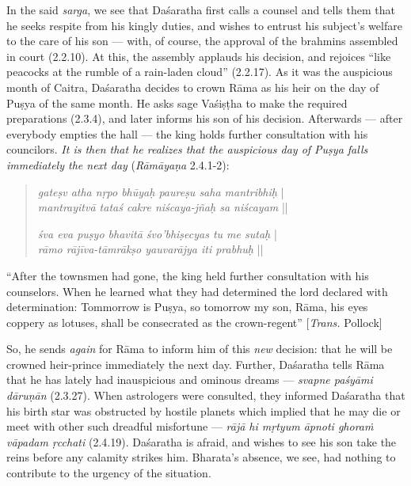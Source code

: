In the said {\sl sarga}, we see that Daśaratha first calls a counsel and tells them that he seeks respite from his kingly duties, and wishes to entrust his subject’s welfare to the care of his son --- with, of course, the approval of the brahmins assembled in court (2.2.10). At this, the assembly applauds his decision, and rejoices “like peacocks at the rumble of a rain-laden cloud” (2.2.17). As it was the auspicious month of Caitra, Daśaratha decides to crown Rāma as his heir on the day of Puṣya of the same month. He asks sage Vaśiṣṭha to make the required preparations (2.3.4), and later informs his son of his decision. Afterwards --- after everybody empties the hall --- the king holds further consultation with his councilors. {\sl It is then that he realizes that the auspicious day of Puṣya falls immediately the next day} ({\sl Rāmāyaṇa} 2.4.1-2):

\begin{quote}
{{\sl gateṣv atha nṛpo bhūyaḥ paureṣu saha mantribhiḥ}} |\\
{{\sl mantrayitvā tataś cakre niścaya-jñaḥ sa niścayam}} ||

{\sl śva eva puṣyo bhavitā śvo’bhiṣecyas tu me sutaḥ} |\\
{\sl rāmo rājīva-tāmrākṣo yauvarājya iti prabhuḥ} ||
\end{quote}

\begin{myquote}
“After the townsmen had gone, the king held further consultation with his counselors. When he learned what they had determined the lord declared with determination: Tommorrow is Puṣya, so tomorrow my son, Rāma, his eyes coppery as lotuses, shall be consecrated as the crown-regent” [{\sl Trans.} Pollock]
\end{myquote}

So, he sends {\sl again} for Rāma to inform him of this {\sl new} decision: that he will be crowned heir-prince immediately the next day. Further, Daśaratha tells Rāma that he has lately had inauspicious and ominous dreams --- {\sl svapne paśyāmi dāruṇān} (2.3.27). When astrologers were consulted, they informed Daśaratha that his birth star was obstructed by hostile planets which implied that he may die or meet with other such dreadful misfortune --- {\sl rājā hi mṛtyum āpnoti ghoraṁ vāpadam ṛcchati} (2.4.19). Daśaratha is afraid, and wishes to see his son take the reins before any calamity strikes him. Bharata’s absence, we see, had nothing to contribute to the urgency of the situation. 

